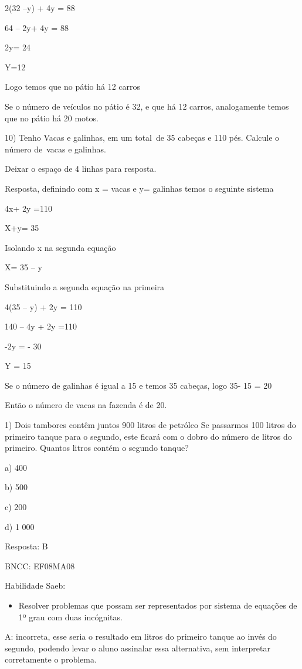 2(32 --y) + 4y = 88

64 -- 2y+ 4y = 88

2y= 24

Y=12

Logo temos que no pátio há 12 carros

Se o número de veículos no pátio é 32, e que há 12 carros, analogamente
temos que no pátio há 20 motos.

10) Tenho Vacas e galinhas, em um total~de 35 cabeças e 110 pés. Calcule
o número de~vacas e galinhas.

Deixar o espaço de 4 linhas para resposta.

Resposta, definindo com x = vacas e y= galinhas temos o seguinte sistema

4x+ 2y =110

X+y= 35

Isolando x na segunda equação

X= 35 -- y

Substituindo a segunda equação na primeira

4(35 -- y) + 2y = 110

140 -- 4y + 2y =110

-2y = - 30

Y = 15

Se o número de galinhas é igual a 15 e temos 35 cabeças, logo 35- 15 =
20

Então o número de vacas na fazenda é de 20.


1) Dois tambores contêm juntos 900 litros de petróleo Se passarmos 100
litros do primeiro tanque para o segundo, este ficará com o dobro do
número de litros do primeiro. Quantos litros contém o segundo tanque?

a) 400

b) 500

c) 200

d) 1 000

Resposta: B

BNCC: EF08MA08

Habilidade Saeb:

\begin{itemize}
\tightlist
\item
  Resolver problemas que possam ser representados por sistema de
  equações de 1º grau com duas incógnitas.
\end{itemize}

A: incorreta, esse seria o resultado em litros do primeiro tanque ao
invés do segundo, podendo levar o aluno assinalar essa alternativa, sem
interpretar corretamente o problema.

